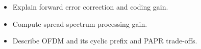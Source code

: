 \begin{objectives}
\begin{itemize}[leftmargin=1.4em,itemsep=2pt]
\item Explain forward error correction and coding gain.
\item Compute spread-spectrum processing gain.
\item Describe OFDM and its cyclic prefix and PAPR trade-offs.
\end{itemize}
\end{objectives}
